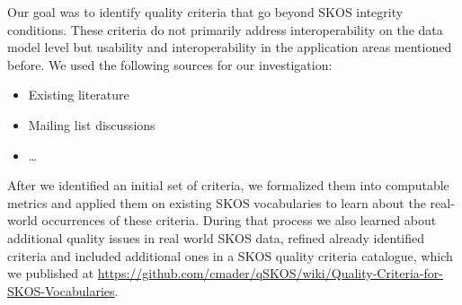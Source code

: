 


Our goal was to identify quality criteria that go beyond SKOS integrity conditions. These criteria do not primarily address interoperability on the data model level but usability and interoperability in the application areas mentioned before. We used the following sources for our investigation:

\begin{itemize}
    \item Existing literature
    \item Mailing list discussions
    \item \ldots {}
\end{itemize}

After we identified an initial set of criteria, we formalized them into computable metrics and applied them on existing SKOS vocabularies to learn about the real-world occurrences of these criteria. During that process we also learned about additional quality issues in real world SKOS data, refined already identified criteria and included additional ones in a SKOS quality criteria catalogue, which we published at \url{https://github.com/cmader/qSKOS/wiki/Quality-Criteria-for-SKOS-Vocabularies}.